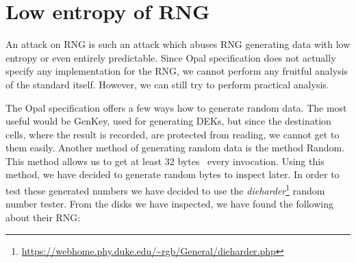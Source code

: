 \section{Low entropy of RNG}
\label{attack_rng}

An attack on RNG is such an attack which abuses RNG generating data with low entropy or even entirely predictable. 
Since Opal specification does not actually specify any implementation for the RNG, we cannot perform any fruitful analysis of the standard itself. However, we can still try to perform practical analysis.

The Opal specification offers a few ways how to generate random data. The most useful would be GenKey, used for generating DEKs, but since the destination cells, where the result is recorded, are protected from reading, we cannot get to them easily. Another method of generating random data is the method Random. This method allows us to get at least 32 bytes~\cite{tcg-opal2} every invocation. Using this method, we have decided to generate random bytes to inspect later.
In order to test these generated numbers we have decided to use the \emph{dieharder}\footnote{\url{https://webhome.phy.duke.edu/~rgb/General/dieharder.php}} random number tester.
From the disks we have inspected, we have found the following about their RNG:

